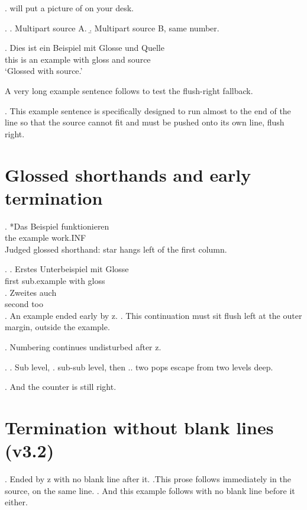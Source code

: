 \documentclass{article}
\begin{document}
\ex.  will put a
picture of  on your desk. 

\ex.
\a. Multipart source A. 
\b. Multipart source B, same number. 

\ex. \gll Dies ist ein Beispiel mit Glosse und Quelle \\
     this is an example with gloss and source \\
\glt `Glossed with source.' 

A very long example sentence follows to test the flush-right fallback.

\ex. This example sentence is specifically designed to run almost to the
end of the line so that the source cannot fit and must be pushed onto its
own line, flush right. 

\section*{Glossed shorthands and early termination}

\exg. *Das Beispiel funktionieren \\
      the example work.INF \\
\glt Judged glossed shorthand: star hangs left of the first column.

\ex.
\ag. Erstes Unterbeispiel mit Glosse \\
     first sub.example with gloss \\
\bg. Zweites auch \\
     second too \\

\ex. An example ended early by z. \z. This continuation must sit flush
left at the outer margin, outside the example.

\ex. Numbering continues undisturbed after z.

\ex.
\a. Sub level,
\a. sub-sub level, then \z.\z. two pops escape from two levels deep.

\ex. And the counter is still right.

\section*{Termination without blank lines (v3.2)}

\ex. Ended by z with no blank line after it. \z.This prose follows
immediately in the source, on the same line.
\ex. And this example follows with no blank line before it either.
\end{document}
